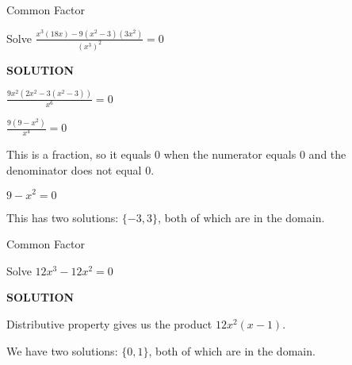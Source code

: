 \documentclass{ximera}
\begin{document}
\begin{example}  Common Factor


Solve $\frac{x^3 (18x) - 9(x^2-3)(3x^2)}{(x^3)^2} = 0$



\textbf{\textcolor{purple!50!blue!90!black}{SOLUTION}}


$\frac{9x^2 (2x^2 - 3(x^2-3))}{x^6} = 0$


$\frac{9 (9 - x^2)}{x^4} = 0$



This is a fraction, so it equals $0$ when the numerator equals $0$ and the denominator does not equal $0$.


$9 - x^2 = 0$

This has two solutions: $\{ -3, 3  \}$, both of which are in the domain.








\end{example}

















\begin{example}  Common Factor


Solve $12 x^3 - 12 x^2 = 0$



\textbf{\textcolor{purple!50!blue!90!black}{SOLUTION}}


Distributive property gives us the product $12 x^2 (x-1)$.




We have two solutions: $\{ 0, 1  \}$, both of which are in the domain.



\end{example}
\end{document}
